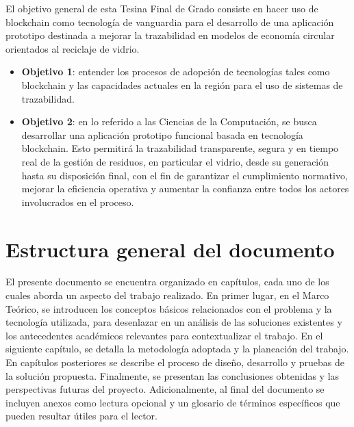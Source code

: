 El objetivo general de esta Tesina Final de Grado consiste en hacer uso de blockchain como tecnología de vanguardia para el desarrollo de una aplicación prototipo destinada a mejorar la trazabilidad en modelos de economía circular orientados al reciclaje de vidrio.

\begin{itemize}
	\item \textbf{Objetivo 1}: entender los procesos de adopción de tecnologías tales como blockchain y las capacidades actuales en la región para el uso de sistemas de trazabilidad.
	\item \textbf{Objetivo 2}: en lo referido a las Ciencias de la Computación, se busca desarrollar una aplicación prototipo funcional basada en tecnología blockchain. Esto permitirá la trazabilidad transparente, segura y en tiempo real de la gestión de residuos, en particular el vidrio, desde su generación hasta su disposición final, con el fin de garantizar el cumplimiento normativo, mejorar la eficiencia operativa y aumentar la confianza entre todos los actores involucrados en el proceso.
\end{itemize}

\section{Estructura general del documento}

El presente documento se encuentra organizado en capítulos, cada uno de los cuales aborda un aspecto del trabajo realizado. En primer lugar, en el Marco Teórico, se introducen los conceptos básicos relacionados con el problema y la tecnología utilizada, para desenlazar en un análisis de las soluciones existentes y los antecedentes académicos relevantes para contextualizar el trabajo. En el siguiente capítulo, se detalla la metodología adoptada y la planeación del trabajo. En capítulos posteriores se describe el proceso de diseño, desarrollo y pruebas de la solución propuesta. Finalmente, se presentan las conclusiones obtenidas y las perspectivas futuras del proyecto. Adicionalmente, al final del documento se incluyen anexos como lectura opcional y un glosario de términos específicos que pueden resultar útiles para el lector.
